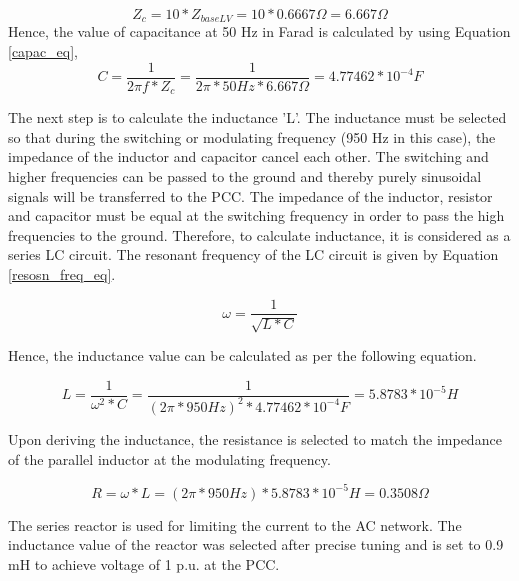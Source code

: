 \begin{equation}
    Z_c = 10 * Z_{baseLV} = 10 * 0.6667 \Omega = 6.667 \Omega   
\end{equation}
Hence, the value of capacitance at 50 Hz in Farad is calculated by using Equation \ref{capac_eq},
\begin{equation}\label{capac_eq}
    C = \frac{1}{2\pi f *Z_c} = \frac{1}{2\pi*50 Hz*6.667\Omega} = 4.77462*10^{-4} F
\end{equation}

The next step is to calculate the inductance 'L'. The inductance must be selected so that during the switching or modulating frequency (950 Hz in this case), the impedance of the inductor and capacitor cancel each other. The switching and higher frequencies can be passed to the ground and thereby purely sinusoidal signals will be transferred to the \gls{PCC}. The impedance of the inductor, resistor and capacitor must be equal at the switching frequency in order to pass the high frequencies to the ground. Therefore, to calculate inductance, it is considered as a series LC circuit. The resonant frequency of the LC circuit is given by Equation \ref{resosn_freq_eq}.

\begin{equation}\label{resosn_freq_eq}
    \omega = \frac{1}{\sqrt{L*C}}    
\end{equation}

Hence, the inductance value can be calculated as per the following equation.

\begin{equation}
    L = \frac{1}{\omega^2*C} = \frac{1}{(2\pi * 950 Hz)^2* 4.77462*10^{-4} F} = 5.8783*10^{-5} H
\end{equation}

Upon deriving the inductance, the resistance is selected to match the impedance of the parallel inductor at the modulating frequency.

\begin{equation}
    R = \omega* L = (2\pi*950 Hz)*5.8783*10^{-5} H = 0.3508 \Omega
\end{equation}

The series reactor is used for limiting the current to the \gls{AC} network. The inductance value of the reactor was selected after precise tuning and is set to 0.9 mH to achieve voltage of 1 p.u. at the \gls{PCC}.

